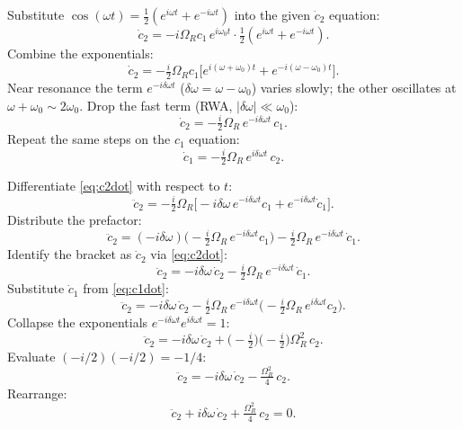 \documentclass[11pt]{article}
\begin{document}
Substitute $\cos(\omega t)=\tfrac12(e^{i\omega t}+e^{-i\omega t})$ into the given $\dot c_2$ equation:
\[
\dot c_2=-i\Omega_R c_1\,e^{i\omega_0 t}\cdot\tfrac12(e^{i\omega t}+e^{-i\omega t}).
\]
Combine the exponentials:
\[
\dot c_2=-\tfrac{i}{2}\Omega_R c_1\bigl[e^{i(\omega+\omega_0)t}+e^{-i(\omega-\omega_0)t}\bigr].
\]
Near resonance the term $e^{-i\delta\omega t}$ ($\delta\omega=\omega-\omega_0$) varies slowly; the other oscillates at $\omega+\omega_0\sim 2\omega_0$. Drop the fast term (RWA, $|\delta\omega|\ll\omega_0$):
\begin{equation}
\dot c_2=-\tfrac{i}{2}\Omega_R\,e^{-i\delta\omega t}\,c_1.
\label{eq:c2dot}
\end{equation}
Repeat the same steps on the $c_1$ equation:
\begin{equation}
\dot c_1=-\tfrac{i}{2}\Omega_R\,e^{i\delta\omega t}\,c_2.
\label{eq:c1dot}
\end{equation}

Differentiate \eqref{eq:c2dot} with respect to $t$:
\[
\ddot c_2=-\tfrac{i}{2}\Omega_R\bigl[-i\delta\omega\,e^{-i\delta\omega t}c_1+e^{-i\delta\omega t}\dot c_1\bigr].
\]
Distribute the prefactor:
\[
\ddot c_2=(-i\delta\omega)\bigl(-\tfrac{i}{2}\Omega_R\,e^{-i\delta\omega t}c_1\bigr)-\tfrac{i}{2}\Omega_R\,e^{-i\delta\omega t}\,\dot c_1.
\]
Identify the bracket as $\dot c_2$ via \eqref{eq:c2dot}:
\[
\ddot c_2=-i\delta\omega\,\dot c_2-\tfrac{i}{2}\Omega_R\,e^{-i\delta\omega t}\,\dot c_1.
\]
Substitute $\dot c_1$ from \eqref{eq:c1dot}:
\[
\ddot c_2=-i\delta\omega\,\dot c_2-\tfrac{i}{2}\Omega_R\,e^{-i\delta\omega t}\bigl(-\tfrac{i}{2}\Omega_R\,e^{i\delta\omega t}c_2\bigr).
\]
Collapse the exponentials $e^{-i\delta\omega t}e^{i\delta\omega t}=1$:
\[
\ddot c_2=-i\delta\omega\,\dot c_2+\bigl(-\tfrac{i}{2}\bigr)\bigl(-\tfrac{i}{2}\bigr)\Omega_R^{2}\,c_2.
\]
Evaluate $(-i/2)(-i/2)=-1/4$:
\[
\ddot c_2=-i\delta\omega\,\dot c_2-\tfrac{\Omega_R^{2}}{4}\,c_2.
\]
Rearrange:
\begin{equation}
\boxed{\;\ddot c_2+i\delta\omega\,\dot c_2+\tfrac{\Omega_R^{2}}{4}\,c_2=0.\;}
\label{eq:c2-ode}
\end{equation}
\end{document}
